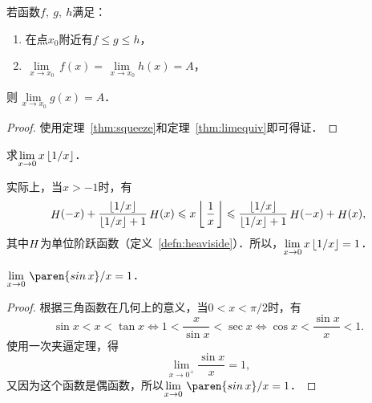 \begin{theorem}[函数极限的夹逼定理]
  \label{thm:funcsqueeze}
  若函数\(f,\ g,\ h\)满足：
  \begin{enumerate}[topsep=0ex,itemsep=0ex]
    \renewcommand{\labelenumi}{\enumparen{\arabic{enumi}}}
  \item 在点\(x_0\)附近有\(f \le g \le h\)，
  \item \(\lim\limits_{\,x \to x_0\!} \,f(x) = \lim\limits_{\,x \to x_0\!} h(x) = A\)，
  \end{enumerate}
  则\(\!\lim\limits_{\,x \to x_0\!} g(x) = A\)．

  \begin{proof}
    使用定理~\ref{thm:squeeze}和定理~\ref{thm:limequiv}即可得证．
  \end{proof}
\end{theorem}

\begin{example*}
  求\(\lim\limits_{x\to0} x \, \lfloor1/x\rfloor\)．

  \begin{remark}
    实际上，当\(x > -1\)时，有
    \begin{equation*}
      \Fn H(-x) + \frac{\floor{1/x}}{\floor{1/x}+1} \Fn H(x)
      \le
      x \, \floor[\bigg]{\,\frac1x\,}
      \le
      \frac{\floor{1/x}}{\floor{1/x}+1} \Fn H(-x) + \Fn H(x),
    \end{equation*}
    其中\(\mathop{\relax H}\nolimits\)为单位阶跃函数（定义~\ref{defn:heaviside}）．所以，\(\lim\limits_{x\to0} x \, \lfloor1/x\rfloor = 1\)．
  \end{remark}
\end{example*}

\begin{theorem*}
  \(\lim\limits_{x\to0} \,\paren{\sin x}/{x} = 1\)．

  \begin{proof}
    根据三角函数在几何上的意义，当\(0 < x < \pi/2\)时，有
    \begin{equation*}
      \sin x < x < \tan x
      \iff
      1 < \frac{x}{\sin x} < \sec x
      \iff
      \cos x < \frac{\sin x}{x} < 1.
    \end{equation*}
    使用一次夹逼定理，得
    \begin{equation*}
      \lim_{x\to0^+\!} \! \frac{\sin x}{x} = 1,
    \end{equation*}
    又因为这个函数是偶函数，所以\(\lim\limits_{x\to0} \,\paren{\sin x}/{x} = 1\)．
  \end{proof}
\end{theorem*}

